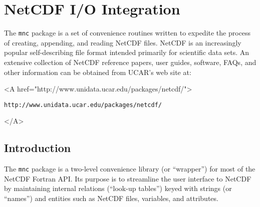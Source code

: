 
\section{NetCDF I/O Integration}
\label{sec:pkg:mnc}

The \texttt{mnc} package is a set of convenience routines written to
expedite the process of creating, appending, and reading NetCDF files.
NetCDF is an increasingly popular self-describing file format
\cite{rew:97} intended primarily for scientific data sets.  An
extensive collection of NetCDF reference papers, user guides,
software, FAQs, and other information can be obtained from UCAR's web
site at:
\begin{rawhtml} <A href="http://www.unidata.ucar.edu/packages/netcdf/"> \end{rawhtml}
\begin{verbatim}
http://www.unidata.ucar.edu/packages/netcdf/
\end{verbatim}
\begin{rawhtml} </A> \end{rawhtml}


\subsection{Introduction}

The \texttt{mnc} package is a two-level convenience library (or
``wrapper'') for most of the NetCDF Fortran API.  Its purpose is to
streamline the user interface to NetCDF by maintaining internal
relations (``look-up tables'') keyed with strings (or ``names'') and
entities such as NetCDF files, variables, and attributes.


